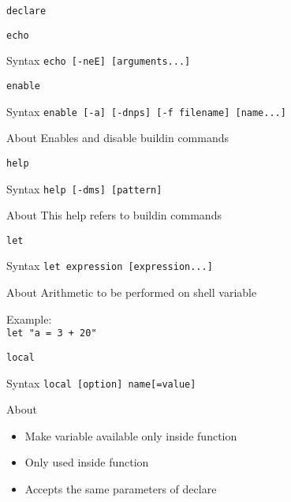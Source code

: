 \documentclass[10pt, compress, aspectratio=169]{beamer}
\begin{document}
\begin{frame}{\texttt{declare}}
  
\end{frame}

\begin{frame}{\texttt{echo}}
  \begin{alertblock}{Syntax}
    \texttt{echo [-neE] [arguments...]}
  \end{alertblock}
\end{frame}

\begin{frame}{\texttt{enable}}
  \begin{alertblock}{Syntax}
    \texttt{enable [-a] [-dnps] [-f filename] [name...]}
  \end{alertblock}

  \begin{exampleblock}{About}
    Enables and disable buildin commands
  \end{exampleblock}
\end{frame}

\begin{frame}{\texttt{help}}
  \begin{alertblock}{Syntax}
    \texttt{help [-dms] [pattern]}
  \end{alertblock}

  \begin{exampleblock}{About}
    This help refers to buildin commands
  \end{exampleblock}
\end{frame}

\begin{frame}{\texttt{let}}
  \begin{alertblock}{Syntax}
    \texttt{let expression [expression...]}
  \end{alertblock}

  \begin{exampleblock}{About}
    Arithmetic to be performed on shell variable
  \end{exampleblock}

  Example: \\
  \texttt{let "a = 3 + 20"}
\end{frame}

\begin{frame}{\texttt{local}}
  \begin{alertblock}{Syntax}
    \texttt{local [option] name[=value]}
  \end{alertblock}

  \begin{exampleblock}{About}
    \begin{itemize}
      \item Make variable available only inside function
      \item Only used inside function
      \item Accepts the same parameters of declare
    \end{itemize}
  \end{exampleblock}
\end{frame}
\end{document}
